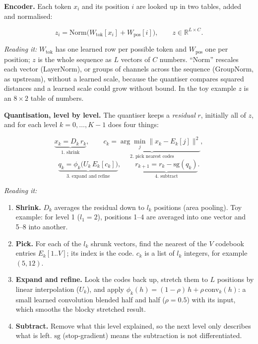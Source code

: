 \documentclass[
  british,
]{article}
\providecommand{\tightlist}{%
  \setlength{\itemsep}{0pt}\setlength{\parskip}{0pt}}
\begin{document}
\textbf{Encoder.} Each token \(x_i\) and its position \(i\) are looked
up in two tables, added and normalised:

\[z_i = \mathrm{Norm}\big(W_{\mathrm{tok}}[x_i] + W_{\mathrm{pos}}[i]\big), \qquad z \in \mathbb{R}^{L \times C}.\]

\emph{Reading it:} \(W_{\mathrm{tok}}\) has one learned row per possible
token and \(W_{\mathrm{pos}}\) one per position; \(z\) is the whole
sequence as \(L\) vectors of \(C\) numbers. ``Norm'' rescales each
vector (LayerNorm), or groups of channels across the sequence
(GroupNorm, as upstream), without a learned scale, because the quantiser
compares squared distances and a learned scale could grow without bound.
In the toy example \(z\) is an \(8 \times 2\) table of numbers.

\textbf{Quantisation, level by level.} The quantiser keeps a
\emph{residual} \(r\), initially all of \(z\), and for each level
\(k = 0, \dots, K-1\) does four things:

\[\underbrace{x_k = D_k\, r_k}_{\text{1. shrink}} ,\qquad
\underbrace{c_k = \arg\min_j \lVert x_k - E_k[j] \rVert^2}_{\text{2. pick nearest codes}},\]
\[\underbrace{q_k = \phi_k\big(U_k\, E_k[c_k]\big)}_{\text{3. expand and refine}},\qquad
\underbrace{r_{k+1} = r_k - \mathrm{sg}(q_k)}_{\text{4. subtract}} .\]

\emph{Reading it:}

\begin{enumerate}
\def\labelenumi{\arabic{enumi}.}
\tightlist
\item
  \textbf{Shrink.} \(D_k\) averages the residual down to \(l_k\)
  positions (area pooling). Toy example: for level 1 (\(l_1 = 2\)),
  positions 1--4 are averaged into one vector and 5--8 into another.
\item
  \textbf{Pick.} For each of the \(l_k\) shrunk vectors, find the
  nearest of the \(V\) codebook entries \(E_k[1..V]\); its index is the
  code. \(c_k\) is a list of \(l_k\) integers, for example \((5, 12)\).
\item
  \textbf{Expand and refine.} Look the codes back up, stretch them to
  \(L\) positions by linear interpolation (\(U_k\)), and apply
  \(\phi_k(h) = (1-\rho)\,h + \rho\,\mathrm{conv}_k(h)\): a small
  learned convolution blended half and half (\(\rho = 0.5\)) with its
  input, which smooths the blocky stretched result.
\item
  \textbf{Subtract.} Remove what this level explained, so the next level
  only describes what is left. \(\mathrm{sg}\) (stop-gradient) means the
  subtraction is not differentiated.
\end{enumerate}
\end{document}
